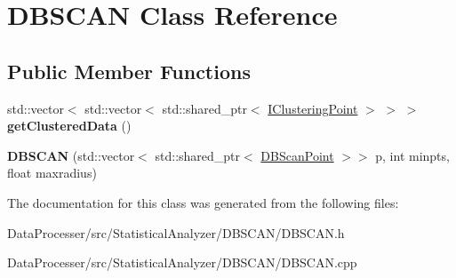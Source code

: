\hypertarget{classDBSCAN}{}\section{D\+B\+S\+C\+AN Class Reference}
\label{classDBSCAN}
\subsection*{Public Member Functions}
\begin{DoxyCompactItemize}
\item 
\mbox{\label{classDBSCAN_addd367e6b66f8695d3e49817ae1210f7}} 
std\+::vector$<$ std\+::vector$<$ std\+::shared\+\_\+ptr$<$ \hyperlink{classIClusteringPoint}{I\+Clustering\+Point} $>$ $>$ $>$ {\bfseries get\+Clustered\+Data} ()
\item 
\mbox{\label{classDBSCAN_aaaf6f99736a6fbe4465dd2475f42d142}} 
{\bfseries D\+B\+S\+C\+AN} (std\+::vector$<$ std\+::shared\+\_\+ptr$<$ \hyperlink{classDBScanPoint}{D\+B\+Scan\+Point} $>$$>$ p, int minpts, float maxradius)
\end{DoxyCompactItemize}


The documentation for this class was generated from the following files\+:\begin{DoxyCompactItemize}
\item 
Data\+Processer/src/\+Statistical\+Analyzer/\+D\+B\+S\+C\+A\+N/D\+B\+S\+C\+A\+N.\+h\item 
Data\+Processer/src/\+Statistical\+Analyzer/\+D\+B\+S\+C\+A\+N/D\+B\+S\+C\+A\+N.\+cpp\end{DoxyCompactItemize}
